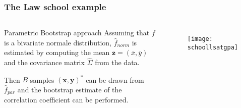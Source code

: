 \frame
{
\frametitle{The Law school example}

\begin{columns}[t]
\begin{exampleblock}{Parametric Bootstrap approach}
Assuming  that $f$ is a bivariate normale distribution, $\hat{f}_{norm}$ is estimated by computing the mean $\overline{\mathbf{z}}=(\overline{x},\overline{y})$ and the covariance matrix $\widehat{\Sigma}$ from the data.

Then $B$ samples $(\mathbf{x},\mathbf{y})^{*}$ %
 can be drawn from $\hat{f}_{par}$ and the bootstrap estimate of the correlation coefficient can be performed. 


\end{exampleblock}
\begin{figure}[!h]
\texttt{[image: schoollsatgpa]}
\end{figure}
\end{columns}

}
